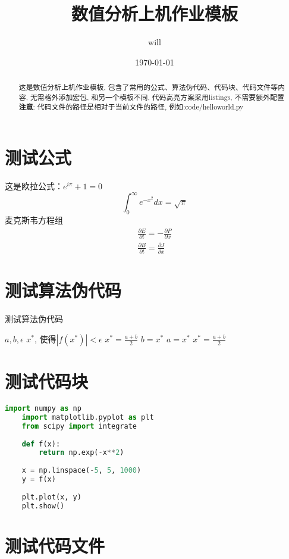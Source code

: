 \documentclass[11pt,a4paper]{TGNAN}
\title{\textbf{数值分析上机作业模板}}
\author{will}
\date{\today}
\begin{document}
\maketitle
\begin{abstract}
    这是数值分析上机作业模板,
    包含了常用的公式、算法伪代码、代码块、代码文件等内容,
    无需格外添加宏包,
    和另一个模板不同,
    代码高亮方案采用listings,
    不需要额外配置\\
    \textbf{注意}:
        代码文件的路径是相对于当前文件的路径, 例如:code/helloworld.py
\end{abstract}
\section{测试公式}
这是欧拉公式：$e^{i\pi}+1=0$
$$
\int_{0}^{\infty} e^{-x^2} dx = \sqrt{\pi}
$$
麦克斯韦方程组
$$
\begin{aligned}
    \frac{\partial E}{\partial t} = -\frac{\partial P}{\partial x} \\
\frac{\partial B}{\partial t} = \frac{\partial J}{\partial x}
\end{aligned}
$$
\section{测试算法伪代码}
\begin{algorithm}
\caption{测试算法伪代码}
\begin{algorithmic}
\REQUIRE $a, b, \epsilon$
\ENSURE $x^*$, 使得$|f(x^*)| < \epsilon$
\STATE $x^* = \frac{a + b}{2}$
\STATE $b = x^*$
\ELSE
\STATE $a = x^*$
\ENDIF
\STATE $x^* = \frac{a + b}{2}$
\ENDWHILE
\end{algorithmic}
\end{algorithm}

\section{测试代码块}

\begin{lstlisting}[language=Python]
    import numpy as np
    import matplotlib.pyplot as plt
    from scipy import integrate
    
    def f(x):
        return np.exp(-x**2)
    
    x = np.linspace(-5, 5, 1000)
    y = f(x)
    
    plt.plot(x, y)
    plt.show()
\end{lstlisting}

\section{测试代码文件}


\end{document}
